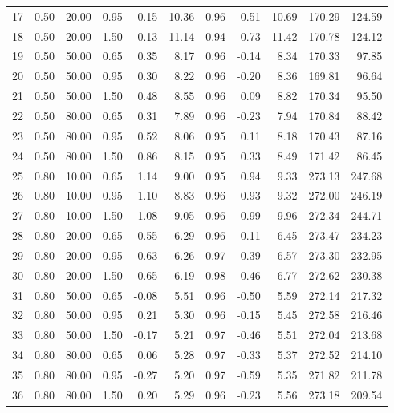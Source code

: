 \documentclass[useAMS, usenatbib, referee]{biom}\usepackage[]{graphicx}\usepackage[]{color}
\begin{document}
\begin{table}[ht]
{\begin{tabular}{rrrrrrrrrrr}
  17 & 0.50 & 20.00 & 0.95 & 0.15 & 10.36 & 0.96 & -0.51 & 10.69 & 170.29 & 124.59 \\ 
  18 & 0.50 & 20.00 & 1.50 & -0.13 & 11.14 & 0.94 & -0.73 & 11.42 & 170.78 & 124.12 \\ 
  19 & 0.50 & 50.00 & 0.65 & 0.35 & 8.17 & 0.96 & -0.14 & 8.34 & 170.33 & 97.85 \\ 
  20 & 0.50 & 50.00 & 0.95 & 0.30 & 8.22 & 0.96 & -0.20 & 8.36 & 169.81 & 96.64 \\ 
  21 & 0.50 & 50.00 & 1.50 & 0.48 & 8.55 & 0.96 & 0.09 & 8.82 & 170.34 & 95.50 \\ 
  22 & 0.50 & 80.00 & 0.65 & 0.31 & 7.89 & 0.96 & -0.23 & 7.94 & 170.84 & 88.42 \\ 
  23 & 0.50 & 80.00 & 0.95 & 0.52 & 8.06 & 0.95 & 0.11 & 8.18 & 170.43 & 87.16 \\ 
  24 & 0.50 & 80.00 & 1.50 & 0.86 & 8.15 & 0.95 & 0.33 & 8.49 & 171.42 & 86.45 \\ 
  25 & 0.80 & 10.00 & 0.65 & 1.14 & 9.00 & 0.95 & 0.94 & 9.33 & 273.13 & 247.68 \\ 
  26 & 0.80 & 10.00 & 0.95 & 1.10 & 8.83 & 0.96 & 0.93 & 9.32 & 272.00 & 246.19 \\ 
  27 & 0.80 & 10.00 & 1.50 & 1.08 & 9.05 & 0.96 & 0.99 & 9.96 & 272.34 & 244.71 \\ 
  28 & 0.80 & 20.00 & 0.65 & 0.55 & 6.29 & 0.96 & 0.11 & 6.45 & 273.47 & 234.23 \\ 
  29 & 0.80 & 20.00 & 0.95 & 0.63 & 6.26 & 0.97 & 0.39 & 6.57 & 273.30 & 232.95 \\ 
  30 & 0.80 & 20.00 & 1.50 & 0.65 & 6.19 & 0.98 & 0.46 & 6.77 & 272.62 & 230.38 \\ 
  31 & 0.80 & 50.00 & 0.65 & -0.08 & 5.51 & 0.96 & -0.50 & 5.59 & 272.14 & 217.32 \\ 
  32 & 0.80 & 50.00 & 0.95 & 0.21 & 5.30 & 0.96 & -0.15 & 5.45 & 272.58 & 216.46 \\ 
  33 & 0.80 & 50.00 & 1.50 & -0.17 & 5.21 & 0.97 & -0.46 & 5.51 & 272.04 & 213.68 \\ 
  34 & 0.80 & 80.00 & 0.65 & 0.06 & 5.28 & 0.97 & -0.33 & 5.37 & 272.52 & 214.10 \\ 
  35 & 0.80 & 80.00 & 0.95 & -0.27 & 5.20 & 0.97 & -0.59 & 5.35 & 271.82 & 211.78 \\ 
  36 & 0.80 & 80.00 & 1.50 & 0.20 & 5.29 & 0.96 & -0.23 & 5.56 & 273.18 & 209.54 \\ 
   \hline
\end{tabular}
}
\endgroup
\end{table}
\end{document}
